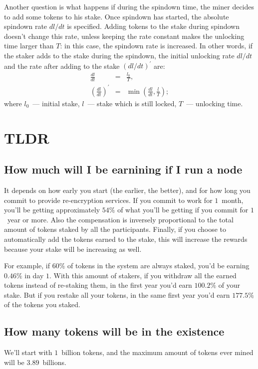\documentclass[longbibliography,nofootinbib,twocolumn]{revtex4-1}
\begin{document}
Another question is what happens if during the spindown time, the miner decides to add some tokens to his stake.
Once spindown has started, the absolute spindown rate $dl/dt$ is specified.
Adding tokens to the stake during spindown doesn't change this rate, unless keeping the rate constant makes the unlocking time larger than $T$:
in this case, the spindown rate is increased.
In other words, if the staker adds to the stake during the spindown, the initial unlocking rate $dl/dt$ and the rate after adding to the stake
$(dl/dt)^{\prime}$ are:
\begin{eqnarray}
    \frac{dl}{dt} &=& \frac{l_0}{T},\\
    \left(\frac{dl}{dt}\right)^{\prime} &=& \min\left( \frac{dl}{dt}, \frac{l}{T}\right);
\end{eqnarray}
where $l_0$~--- initial stake, $l$~--- stake which is still locked, $T$~--- unlocking time.

\section{TLDR}

\subsection{How much will I be earnining if I run a node}
It depends on how early you start (the earlier, the better), and for how long you commit to provide re-encryption services.
If you commit to work for $1$~month, you'll be getting approximately $54\%$ of what you'll be getting if you commit for $1$~year or more.
Also the compensation is inversely proportional to the total amount of tokens staked by all the participants.
Finally, if you choose to automatically add the tokens earned to the stake, this will increase the rewards because your stake will be increasing as well.

For example, if $60\%$ of tokens in the system are always staked, you'd be earning $0.46\%$ in day $1$.
With this amount of stakers, if you withdraw all the earned tokens instead of re-staking them, in the first year you'd earn $100.2\%$ of your stake.
But if you restake all your tokens, in the same first year you'd earn $177.5\%$ of the tokens you staked.

\subsection{How many tokens will be in the existence}
We'll start with $1$~billion tokens, and the maximum amount of tokens ever mined will be $3.89$~billions.
\end{document}
